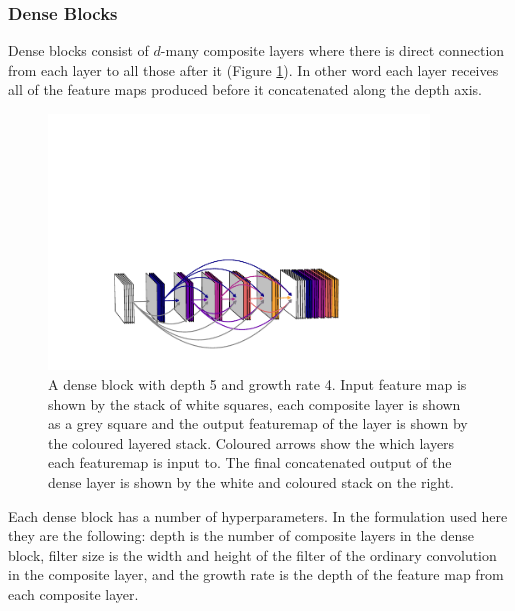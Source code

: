 \subsubsection{Dense Blocks}
Dense blocks consist of $d$-many composite layers where there is direct connection from each layer to all those after it (Figure \ref{fig:machine_learning:dense_block}). 
In other word each layer receives all of the feature maps produced before it concatenated along the depth axis. 
\begin{figure}[h!]
    \includegraphics[width=0.90\textwidth]{figures/machine_learning/dense_block.pdf}
    \caption{A dense block with depth 5 and growth rate 4. Input feature map is shown by the stack of white squares, each composite layer is shown as a grey square and the output featuremap of the layer is shown by the coloured layered stack. Coloured arrows show the which layers each featuremap is input to. The final concatenated output of the dense layer is shown by the white and coloured stack on the right.}
        \label{fig:machine_learning:dense_block}
\end{figure}
Each dense block has a number of hyperparameters. In the formulation used here they are the following: depth is the number of composite layers in the dense block, filter size is the width and height of the filter of the ordinary convolution in the composite layer, and the growth rate is the depth of the feature map from each composite layer.


